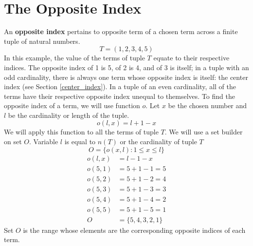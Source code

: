 \documentclass[twoside,openany,12pt]{book}
\begin{document}
    \section{The Opposite Index}
    An \textbf{opposite index} pertains to opposite term of a chosen term across a finite tuple of natural numbers.
    \begin{equation*}
        T = (1,2,3,4,5)
    \end{equation*}
    In this example, the value of the terms of tuple $T$ equate to their respective indices. The opposite index of 1 is 5, of 2 is 4, and of 3 is itself; in a tuple with an odd cardinality, there is always one term whose opposite index is itself: the center index (see Section \ref{center_index}). In a tuple of an even cardinality, all of the terms have their respective opposite index unequal to themselves. To find the opposite index of a term, we will use function $o$. Let $x$ be the chosen number and $l$ be the cardinality or length of the tuple.
    \begin{equation}
        o(l,x) = l + 1 - x
    \end{equation}
    We will apply this function to all the terms of tuple $T$. We will use a set builder on set $O$. Variable $l$ is equal to $n(T)$ or the cardinality of tuple $T$
    \begin{equation*}
        O = \{ o(x,l) : 1 \leq x \leq l\}
    \end{equation*}
    \begin{equation*}
        \begin{split}
            o(l,x) &= l - 1 - x \\
            o(5,1) &= 5 + 1 - 1 = 5 \\
            o(5,2) &= 5 + 1 - 2 = 4 \\
            o(5,3) &= 5 + 1 - 3 = 3 \\
            o(5,4) &= 5 + 1 - 4 = 2 \\
            o(5,5) &= 5 + 1 - 5 = 1 \\
            O &= \{5,4,3,2,1\}
        \end{split}
    \end{equation*}
    Set $O$ is the range whose elements are the corresponding opposite indices of each term.
    
\end{document}
